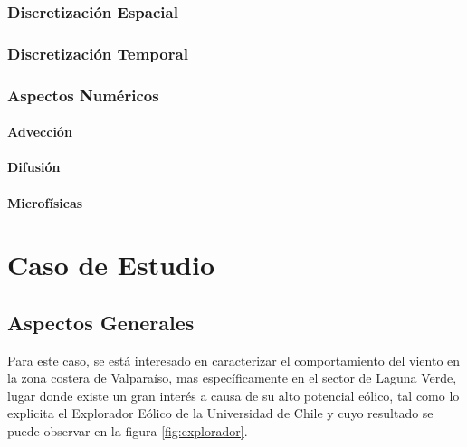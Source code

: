 \subsection{Discretización Espacial}
\subsection{Discretización Temporal}
\subsection{Aspectos Numéricos}
\subsubsection{Advección}
\subsubsection{Difusión}
\subsubsection{Microfísicas}


\chapter{Caso de Estudio}
\section{Aspectos Generales}
Para este caso, se está interesado en caracterizar el comportamiento del viento en la zona costera de Valparaíso, mas específicamente en el sector de Laguna Verde, lugar donde existe un gran interés a causa de su alto potencial eólico, tal como lo explicita el Explorador Eólico de la Universidad de Chile y cuyo resultado se puede observar en la figura \ref{fig:explorador}.

